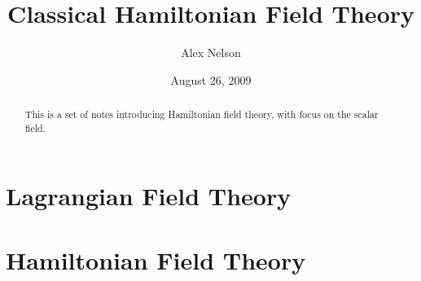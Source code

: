 \documentclass[final]{amsart}
\title{Classical Hamiltonian Field Theory}
\date{August 26, 2009}
\author{Alex Nelson}
\numberwithin{equation}{section}
\begin{document}
\begin{abstract}
This is a set of notes introducing Hamiltonian field theory, with
focus on the scalar field.
\end{abstract}
\maketitle
\tableofcontents

\section{Lagrangian Field Theory}

\section{Hamiltonian Field Theory}


\nocite{*}


\end{document}
